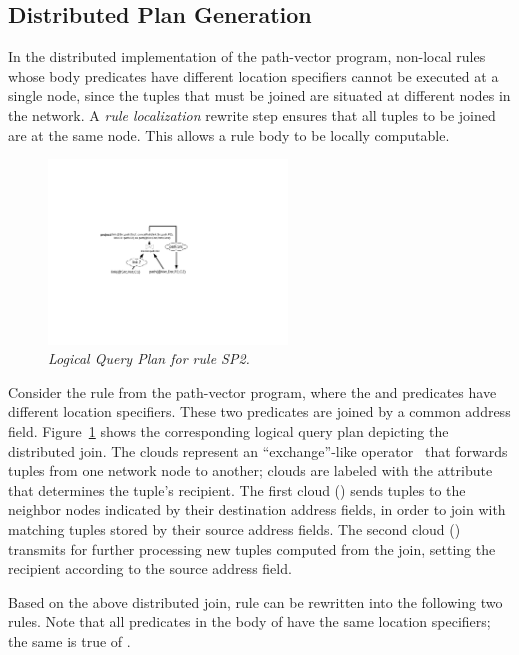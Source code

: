  
\subsection{Distributed Plan Generation}
\label{subsec:ruleLocalization}

In the distributed implementation of the path-vector program,
non-local rules whose body predicates have different location
specifiers cannot be executed at a single node, since the tuples that
must be joined are situated at different nodes in the network. A {\em
  rule localization} rewrite step ensures that all tuples to be joined
are at the same node. This allows a rule body to be locally
computable.


\begin{figure}[ht]
\centering
  \includegraphics[width=2.5in]{graphs/reachable}
\caption{\label{Right Reachable}\emph{\small Logical Query Plan for rule
    SP2. }}
\end{figure}                                              


Consider the rule  from the path-vector program, where the  and
 predicates have different location specifiers. These two
predicates are joined by a common  address
field. Figure~\ref{Right Reachable} shows the corresponding logical
query plan depicting the distributed join. The clouds represent an
``exchange''-like operator~\cite{volcano} that forwards tuples from
one network node to another; clouds are labeled with the 
attribute that determines the tuple's recipient. The first cloud
() sends  tuples to the neighbor nodes indicated by their
destination address fields, in order to join with matching  tuples
stored by their source address fields. The second cloud ()
transmits for further processing new  tuples computed from the
join, setting the recipient according to the source address field.

Based on the above distributed join, rule  can be rewritten into
the following two rules. Note that all predicates in the body of 
have the same location specifiers; the same is true of .

